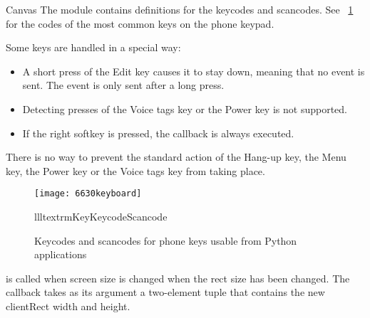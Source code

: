 \begin{classdesc}{Canvas}{}
The  module contains definitions for the keycodes and 
scancodes. See \figurename~\ref{fig:keyboard} for the codes of the most 
common keys on the phone keypad. 

Some keys are handled in a special way:

\begin{itemize}
\item A short press of the Edit key causes it to stay down, meaning that no  event is sent. The event is only sent after a long press.
\item Detecting presses of the Voice tags key or the Power key is not supported.
\item If the right softkey is pressed, the  callback is always executed.
\end{itemize}

There is no way to prevent the standard action of the Hang-up key, the Menu 
key, the Power key or the Voice tags key from taking place.

\begin{figure}
\centering
\texttt{[image: 6630keyboard]}
\begin{tableiii}{lll}{textrm}{Key}{Keycode}{Scancode}
\end{tableiii}
\caption{Keycodes and scancodes for phone keys usable from Python applications}
\label{fig:keyboard}
\end{figure}

 is called when screen size is changed when the 
 rect size has been changed. The callback takes as its argument a
two-element tuple that contains the new clientRect width and height. 

\end{classdesc}

